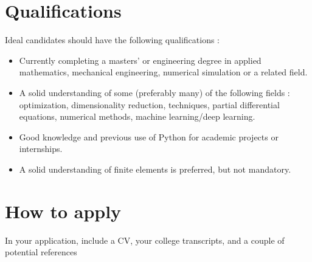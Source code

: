 \documentclass[12pt]{article}
\begin{document}
	
	\section{Qualifications}
	Ideal candidates should have the following qualifications :
	\begin{itemize}
		\item Currently completing a masters' or engineering degree in applied mathematics, mechanical engineering, numerical simulation or a related field.
		\item A solid understanding of some (preferably many) of the following fields : optimization, dimensionality reduction, techniques, partial differential equations, numerical methods, machine learning/deep learning.
		\item Good knowledge and previous use of Python for academic projects or internships.
		\item A solid understanding of finite elements is preferred, but not mandatory.
	\end{itemize}
	\section{How to apply}
	In your application, include a CV, your college transcripts, and a couple of potential references%
	
	
\end{document}
